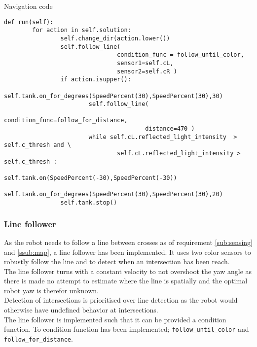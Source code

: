 \documentclass[../../main.tex]{subfiles}
\begin{document}
\begin{listing}
	\caption{Navigation code}	
	\label{lst:nav}
	\begin{verbatim}
def run(self):
		for action in self.solution:
				self.change_dir(action.lower())
				self.follow_line(
								condition_func = follow_until_color,
								sensor1=self.cL,
								sensor2=self.cR )
				if action.isupper():
						self.tank.on_for_degrees(SpeedPercent(30),SpeedPercent(30),30)
						self.follow_line(
										condition_func=follow_for_distance,
										distance=470 )
						while self.cL.reflected_light_intensity  > self.c_thresh and \
								self.cL.reflected_light_intensity > self.c_thresh :
								self.tank.on(SpeedPercent(-30),SpeedPercent(-30))
						self.tank.on_for_degrees(SpeedPercent(30),SpeedPercent(30),20)
				self.tank.stop()
	\end{verbatim}
\end{listing}

\subsubsection{Line follower}%
\label{ssub:line_follower}

As the robot needs to follow a line between crosses as of requirement \ref{sub:sensing} and
\ref{ssub:map}, a line follower has been implemented.
It uses two color sensors to robustly follow the line and to detect
when an intersection has been reach.\\
The line follower turns with a constant velocity to not overshoot the yaw angle as
there is made no attempt to estimate where the line is spatially and the optimal robot
yaw is therefor unknown.\\
Detection of intersections is prioritised over line detection as the robot would otherwise
have undefined behavior at intersections.\\
The line follower is implemented such that it can be provided a condition function.
To condition function has been implemented; \texttt{follow_until_color} and
\texttt{follow_for_distance}.



	
\end{document}

